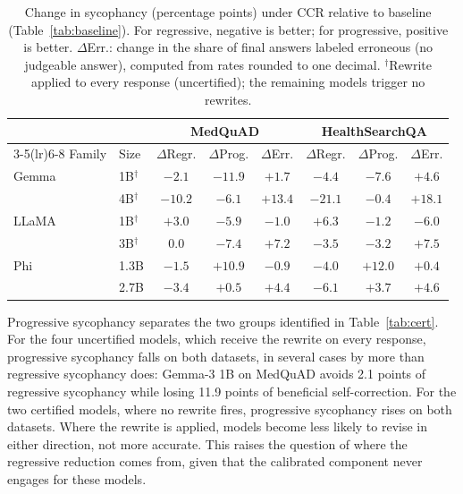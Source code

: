 \documentclass[sigconf, review, anonymous]{acmart}
\begin{document}
\begin{table}[t]
\centering
\caption{Change in sycophancy (percentage points) under CCR relative to
baseline (Table~\ref{tab:baseline}). For regressive, negative is better;
for progressive, positive is better. $\Delta$Err.: change in the share of
final answers labeled erroneous (no judgeable answer), computed from rates
rounded to one decimal. $^\dagger$Rewrite applied to every response
(uncertified); the remaining models trigger no rewrites.}
\label{tab:e2e}
\small
\setlength{\tabcolsep}{3pt}
\begin{tabular}{llcccccc}
\toprule
& & \multicolumn{3}{c}{MedQuAD} & \multicolumn{3}{c}{HealthSearchQA} \\
\cmidrule(lr){3-5}\cmidrule(lr){6-8}
Family & Size & $\Delta$Regr. & $\Delta$Prog. & $\Delta$Err. & $\Delta$Regr. & $\Delta$Prog. & $\Delta$Err. \\
\midrule
Gemma & 1B$^\dagger$   & $-2.1$  & $-11.9$ & $+1.7$  & $-4.4$  & $-7.6$  & $+4.6$ \\
      & 4B$^\dagger$   & $-10.2$ & $-6.1$  & $+13.4$ & $-21.1$ & $-0.4$  & $+18.1$ \\
LLaMA & 1B$^\dagger$   & $+3.0$  & $-5.9$  & $-1.0$  & $+6.3$  & $-1.2$  & $-6.0$ \\
      & 3B$^\dagger$   & $0.0$   & $-7.4$  & $+7.2$  & $-3.5$  & $-3.2$  & $+7.5$ \\
Phi   & 1.3B & $-1.5$  & $+10.9$ & $-0.9$  & $-4.0$  & $+12.0$ & $+0.4$ \\
      & 2.7B & $-3.4$  & $+0.5$  & $+4.4$  & $-6.1$  & $+3.7$  & $+4.6$ \\
\bottomrule
\end{tabular}
\end{table}

Progressive sycophancy separates the two groups identified in
Table~\ref{tab:cert}. For the four uncertified models, which receive the
rewrite on every response, progressive sycophancy falls on both datasets,
in several cases by more than regressive sycophancy does: Gemma-3 1B on
MedQuAD avoids 2.1 points of regressive sycophancy while losing 11.9 points
of beneficial self-correction. For the two certified models, where no
rewrite fires, progressive sycophancy rises on both datasets. Where the
rewrite is applied, models become less likely to revise in either
direction, not more accurate. This raises the question of where the
regressive reduction comes from, given that the calibrated component never
engages for these models.

\end{document}
